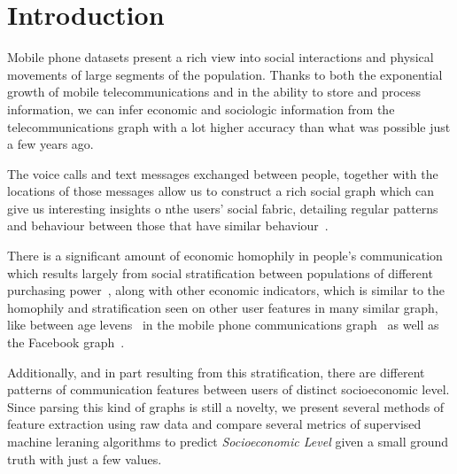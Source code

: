 \section{Introduction}

Mobile phone datasets present a rich view into social interactions and physical movements of large segments of the population. Thanks to both the exponential growth of mobile telecommunications and in the ability to store and process information, we can infer economic and sociologic information from the telecommunications graph with a lot higher accuracy than what was possible just a few years ago.

The voice calls and text messages exchanged between people, together with the locations of those messages allow us to construct a rich social graph which can give us interesting insights o nthe users' social fabric, detailing regular patterns and behaviour between those that have similar behaviour~\cite{gonzalez2008understanding, ponieman2013human, sarraute2015city}.

There is a significant amount of economic homophily in people's communication~\cite{fixman2016inference} which results largely from social stratification between populations of different purchasing power~\cite{leo2015socioeconomic}, along with other economic indicators, which is similar to the homophily and stratification seen on other user features in many similar graph, like between age levens~\cite{mcpherson2001birds} in the mobile phone communications graph~\cite{sarraute2014} as well as the Facebook graph~\cite{ugander2011anatomy}.

Additionally, and in part resulting from this stratification, there are different patterns of communication features between users of distinct socioeconomic level. Since parsing this kind of graphs is still a novelty, we present several methods of feature extraction using raw data and compare several metrics of supervised machine leraning algorithms to predict \emph{Socioeconomic Level} given a small ground truth with just a few values.
